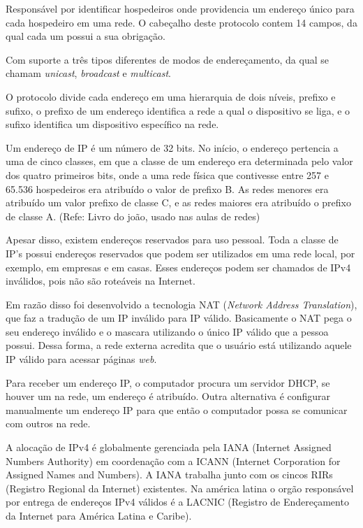 Responsável por identificar hospedeiros onde providencia um endereço único para cada hospedeiro em uma rede. O cabeçalho deste protocolo contem 14 campos, da qual cada um possui a sua obrigação.

Com suporte a três tipos diferentes de modos de endereçamento, da qual se chamam \textit{unicast}, \textit{broadcast} e \textit{multicast}.

O protocolo divide cada endereço em uma hierarquia de dois níveis, prefixo e sufixo, o prefixo de um endereço identifica a rede a qual o dispositivo se liga, e o sufixo identifica um dispositivo específico na rede. 

Um endereço de IP é um número de 32 bits. No início, o endereço pertencia a uma de cinco classes, em que a classe de um endereço era determinada pelo valor dos quatro primeiros bits, onde a uma rede física que contivesse entre 257 e 65.536 hospedeiros era atribuído o valor de prefixo B. As redes menores era atribuído um valor prefixo de classe C, e as redes maiores era atribuído o prefixo de classe A. (Refe: Livro do joão, usado nas aulas de redes)

Apesar disso, existem endereços reservados para uso pessoal. Toda a classe de IP's possui endereços reservados que podem ser utilizados em uma rede local, por exemplo, em empresas e em casas. Esses endereços podem ser chamados de IPv4 inválidos, pois não são roteáveis na Internet.

Em razão disso foi desenvolvido a tecnologia NAT (\textit{Network Address Translation}), que faz a tradução de um IP inválido para IP válido. Basicamente o NAT  pega o seu endereço inválido e o mascara utilizando o único IP válido que a pessoa possui. Dessa forma, a rede externa acredita que o usuário está utilizando aquele IP válido para acessar páginas \textit{web}.

Para receber um endereço IP, o computador procura um servidor DHCP, se houver um na rede, um endereço é atribuído. Outra alternativa é configurar manualmente um endereço IP para que então o computador possa se comunicar com outros na rede.

A alocação de IPv4 é globalmente gerenciada pela IANA (Internet Assigned Numbers Authority) em coordenação com a ICANN (Internet Corporation for Assigned Names and Numbers). A IANA trabalha junto com os cincos RIRs (Registro Regional da Internet) existentes. Na américa latina o orgão responsável por entrega de endereços IPv4 válidos é a LACNIC (Registro de Endereçamento da Internet para América Latina e Caribe).

